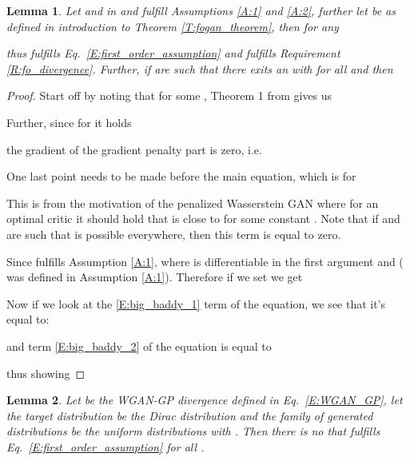 \documentclass{article}
\newtheorem{lemma}{Lemma}
\begin{document}
\begin{lemma}\label{L:first_order}
 Let  and  in  and fulfill Assumptions \ref{A:1} and \ref{A:2},
 further let  be as defined in introduction to Theorem \ref{T:fogan_theorem},
 then for any 
 
 thus  fulfills Eq.\ \ref{E:first_order_assumption} and  fulfills Requirement \ref{R:fo_divergence}.
 Further, if  are such that there exits an  with  for all 
 and  then
 
\end{lemma}

\begin{proof}
Start off by noting that for some , Theorem 1 from \cite{milgrom2002envelope} gives us

Further, since for  it holds

the gradient of the gradient penalty part is zero, i.e.


One last point needs to be made before the main equation, which is for 

This is from the motivation of the penalized Wasserstein GAN where for an optimal critic it should hold that
 is close to  for some constant . Note that if  and 
are such that  is possible everywhere, then this term is equal to zero.


Since  fulfills Assumption \ref{A:1},  where  is differentiable in the first argument and 
( was defined in Assumption \ref{A:1}).
Therefore if we set  we get

  Now if we look at the \ref{E:big_baddy_1} term of the equation, we see that it's equal to:
  
  and term \ref{E:big_baddy_2} of the equation is equal to
  
  thus showing
  
\end{proof}
 


 \begin{lemma}\label{L:wgan_counterexample}
  Let  be the WGAN-GP divergence defined in Eq.\ \ref{E:WGAN_GP}, let the target distribution be the Dirac distribution 
  and the family of generated distributions be the uniform distributions  with . Then there is no
   that fulfills Eq.\ \ref{E:first_order_assumption} for all .
 \end{lemma}
\end{document}

